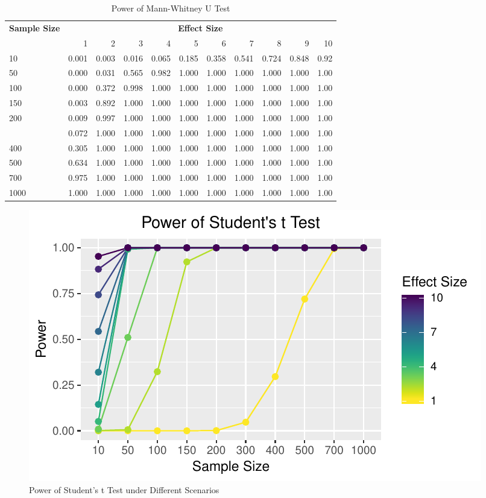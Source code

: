 \documentclass[]{article}
\begin{document}
\begin{table}

\caption{\label{tab:power-tables}Power of Mann-Whitney U Test}
\centering
\begin{tabular}[t]{lrrrrrrrrrr}
\toprule
\multicolumn{ 1}{c}{\bfseries Sample Size} & \multicolumn{10}{c}{\bfseries Effect Size} \\
\cmidrule(l{2pt}r{2pt}){1-1} \cmidrule(l{2pt}r{2pt}){2-11}
  & 1 & 2 & 3 & 4 & 5 & 6 & 7 & 8 & 9 & 10\\
\midrule
10 & 0.001 & 0.003 & 0.016 & 0.065 & 0.185 & 0.358 & 0.541 & 0.724 & 0.848 & 0.92\\
50 & 0.000 & 0.031 & 0.565 & 0.982 & 1.000 & 1.000 & 1.000 & 1.000 & 1.000 & 1.00\\
100 & 0.000 & 0.372 & 0.998 & 1.000 & 1.000 & 1.000 & 1.000 & 1.000 & 1.000 & 1.00\\
150 & 0.003 & 0.892 & 1.000 & 1.000 & 1.000 & 1.000 & 1.000 & 1.000 & 1.000 & 1.00\\
200 & 0.009 & 0.997 & 1.000 & 1.000 & 1.000 & 1.000 & 1.000 & 1.000 & 1.000 & 1.00\\
\addlinespace
300 & 0.072 & 1.000 & 1.000 & 1.000 & 1.000 & 1.000 & 1.000 & 1.000 & 1.000 & 1.00\\
400 & 0.305 & 1.000 & 1.000 & 1.000 & 1.000 & 1.000 & 1.000 & 1.000 & 1.000 & 1.00\\
500 & 0.634 & 1.000 & 1.000 & 1.000 & 1.000 & 1.000 & 1.000 & 1.000 & 1.000 & 1.00\\
700 & 0.975 & 1.000 & 1.000 & 1.000 & 1.000 & 1.000 & 1.000 & 1.000 & 1.000 & 1.00\\
1000 & 1.000 & 1.000 & 1.000 & 1.000 & 1.000 & 1.000 & 1.000 & 1.000 & 1.000 & 1.00\\
\bottomrule
\end{tabular}
\end{table}

\begin{figure}
\centering
\includegraphics{../figure/power_t.pdf}
\caption{Power of Student's t Test under Different Scenarios}
\end{figure}
\end{document}

